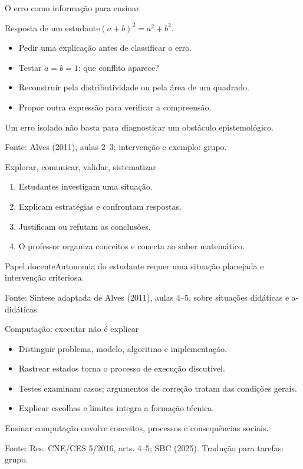 \documentclass[aspectratio=169,11pt]{beamer}
\newcommand{\fonte}[1]{\par\vfill{\tiny\color{gray}Fonte: #1}}
\begin{document}
\begin{frame}{O erro como informação para ensinar}
\begin{block}{Resposta de um estudante}$(a+b)^2=a^2+b^2$.\end{block}\begin{itemize}\item Pedir uma explicação antes de classificar o erro.\item Testar $a=b=1$: que conflito aparece?\item Reconstruir pela distributividade ou pela área de um quadrado.\item Propor outra expressão para verificar a compreensão.\end{itemize}\medskip Um erro isolado não basta para diagnosticar um obstáculo epistemológico.
\fonte{Alves (2011), aulas 2--3; intervenção e exemplo: grupo.}
\end{frame}
\begin{frame}{Explorar, comunicar, validar, sistematizar}
\begin{enumerate}\item Estudantes investigam uma situação.\item Explicam estratégias e confrontam respostas.\item Justificam ou refutam as conclusões.\item O professor organiza conceitos e conecta ao saber matemático.\end{enumerate}\begin{alertblock}{Papel docente}Autonomia do estudante requer uma situação planejada e intervenção criteriosa.\end{alertblock}
\fonte{Síntese adaptada de Alves (2011), aulas 4--5, sobre situações didáticas e a-didáticas.}
\end{frame}
\begin{frame}{Computação: executar não é explicar}
\begin{itemize}\item Distinguir problema, modelo, algoritmo e implementação.\item Rastrear estados torna o processo de execução discutível.\item Testes examinam casos; argumentos de correção tratam das condições gerais.\item Explicar escolhas e limites integra a formação técnica.\end{itemize}\medskip Ensinar computação envolve conceitos, processos e consequências sociais.
\fonte{Res. CNE/CES 5/2016, arts. 4--5; SBC (2025). Tradução para tarefas: grupo.}
\end{frame}
\end{document}
